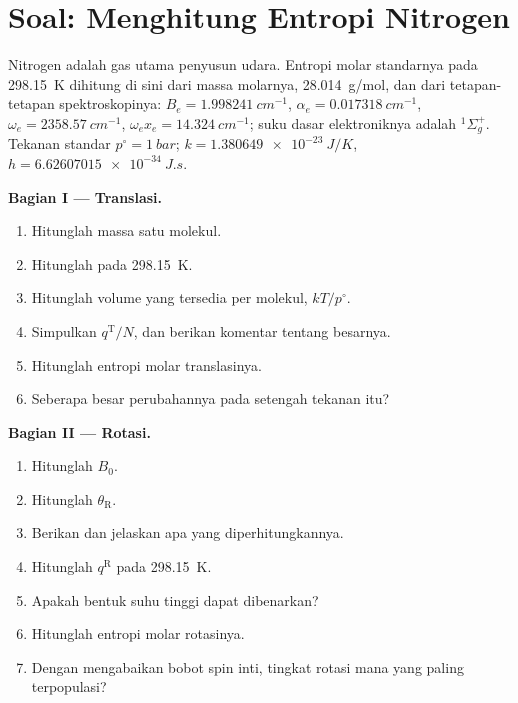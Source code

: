 \section{Soal: Menghitung Entropi Nitrogen}

\begin{problem}
\label{pb:b3:partition-functions:1}
Nitrogen adalah gas utama penyusun udara. Entropi molar standarnya pada
\qty{298.15}{K} dihitung di sini dari massa molarnya, \qty{28.014}{g/mol}, dan dari
tetapan-tetapan spektroskopinya: $B_e = \qty{1.998241}{cm^{-1}}$,
$\alpha_e = \qty{0.017318}{cm^{-1}}$, $\omega_e =
\qty{2358.57}{cm^{-1}}$, $\omega_ex_e = \qty{14.324}{cm^{-1}}$; suku dasar elektroniknya
adalah ${}^1\Sigma_g^+$. Tekanan standar $p^\circ = \qty{1}{bar}$;
$k = \qty{1.380649e-23}{J/K}$, $h = \qty{6.62607015e-34}{J.s}$.

\medskip\noindent\textbf{Bagian I --- Translasi.}
\begin{enumerate}[beginpenalty=10000]
  \item Hitunglah massa satu molekul.
  \item Hitunglah  pada \qty{298.15}{K}.
  \item Hitunglah volume yang tersedia per molekul, $kT/p^\circ$.
  \item Simpulkan $q^{\mathrm T}/N$, dan berikan komentar tentang besarnya.
  \item Hitunglah entropi molar translasinya.
  \item Seberapa besar perubahannya pada setengah tekanan itu?
\end{enumerate}

\medskip\noindent\textbf{Bagian II --- Rotasi.}
\begin{enumerate}[resume, beginpenalty=10000]
  \item Hitunglah $B_0$.
  \item Hitunglah $\theta_{\mathrm R}$.
  \item Berikan  dan jelaskan apa yang diperhitungkannya.
  \item Hitunglah $q^{\mathrm R}$ pada \qty{298.15}{K}.
  \item Apakah bentuk suhu tinggi dapat dibenarkan?
  \item Hitunglah entropi molar rotasinya.
  \item Dengan mengabaikan bobot spin inti, tingkat rotasi mana yang paling
        terpopulasi?
\end{enumerate}


\end{problem}
